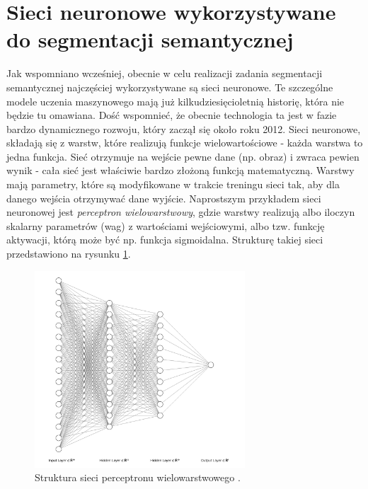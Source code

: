 \documentclass{classrep}
\begin{document}
    \section{Sieci neuronowe wykorzystywane do segmentacji semantycznej} {

        Jak wspomniano wcześniej, obecnie w celu realizacji zadania segmentacji semantycznej najczęściej
        wykorzystywane są sieci neuronowe. Te szczególne modele uczenia maszynowego mają już
        kilkudziesięcioletnią historię, która nie będzie tu omawiana. Dość wspomnieć, że obecnie technologia
        ta jest w fazie bardzo dynamicznego rozwoju, który zaczął się około roku 2012. Sieci neuronowe,
        składają się z warstw, które realizują funkcje wielowartościowe - każda warstwa to jedna funkcja.
        Sieć otrzymuje na wejście pewne dane (np. obraz) i zwraca pewien wynik - cała sieć jest właściwie
        bardzo złożoną funkcją matematyczną. Warstwy mają parametry, które są modyfikowane w trakcie
        treningu sieci tak, aby dla danego wejścia otrzymywać dane wyjście. Naprostszym przykładem sieci
        neuronowej jest \emph{perceptron wielowarstwowy}, gdzie warstwy realizują albo iloczyn skalarny
        parametrów (wag) z wartościami wejściowymi, albo tzw. funkcję aktywacji, którą może być np. funkcja
        sigmoidalna. Strukturę takiej sieci przedstawiono na rysunku \ref{fig:perceptron}.

        \begin{figure}[!htbp]
        \centering
        \includegraphics[width=0.7\textwidth]{img/perceptron.png}
        \caption{Struktura sieci perceptronu wielowarstwowego \cite{url:perceptron}.}
        \label{fig:perceptron}
        \end{figure}
        \FloatBarrier

}
\end{document}
